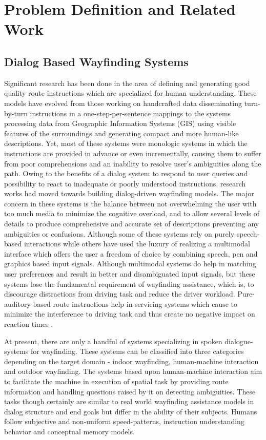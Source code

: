 \documentclass{iitkthesis}
\begin{document}
 \chapter{Problem Definition and Related Work}
 \section{Dialog Based Wayfinding Systems} 
 Significant research has been done in the area of defining \cite{lovelace} and generating \cite{Dale,Habel,Maab,pattabhiraman} good quality route instructions which are specialized for human understanding. These models have evolved from those working on handcrafted data disseminating turn-by-turn instructions in a one-step-per-sentence mappings to the systems processing data from Geographic Information Systems (GIS) using visible features of the surroundings and generating compact and more human-like descriptions. Yet, most of these systems were monologic systems in which the instructions are provided in advance or even incrementally, causing them to suffer from poor comprehensions and an inability to resolve user's ambiguities along the path. Owing to the benefits of a dialog system to respond to user queries and possibility to react to inadequate or poorly understood instructions, research works \cite{hurtig, jokinen, richter} had moved towards building dialog-driven wayfinding models. The major concern in these systems is the balance between not overwhelming the user with too much media to minimize the cognitive overload, and to allow several levels of details to produce comprehensive and accurate set of descriptions preventing any ambiguities or confusions. Although some \cite{richter} of these systems rely on purely speech-based interactions while others \cite{hurtig,jokinen} have used the luxury of realizing a multimodal interface which offers the user a freedom of choice by combining speech, pen and graphics based input signals. Although multimodal systems do help in matching user preferences and result in better and disambiguated input signals, but these systems lose the fundamental requirement of wayfinding assistance, which is, to discourage distractions from driving task and reduce the driver workload. Pure-auditory based route instructions help in servicing systems which cause to minimize the interference to driving task and thus create no negative impact on reaction times \cite{srinivasaneffect}. 
 
At present, there are only a handful of systems specializing in spoken dialogue-systems for wayfinding. These systems can be classified into three categories depending on the target domain - indoor wayfinding, human-machine interaction and outdoor wayfinding. The systems \cite{fongsurvey} based upon human-machine interaction aim to facilitate the machine in execution of spatial task by providing route information and handling questions raised by it on detecting ambiguities. These tasks though certainly are similar to real world wayfinding assistance models in dialog structure and end goals but differ in the ability of their subjects. Humans follow subjective and non-uniform speed-patterns, instruction understanding behavior and conceptual memory models. 
\end{document}
